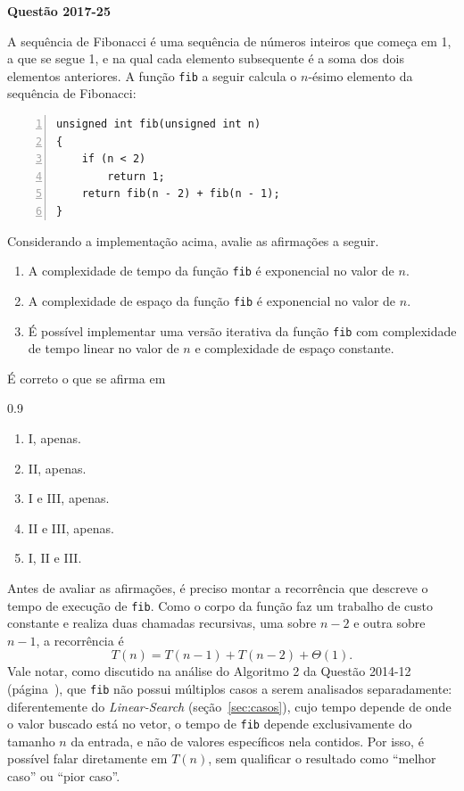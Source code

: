 \documentclass[12pt,a4paper]{article}
\newenvironment{question}[1]{%
    \pdfbookmark[3]{Questão #1}{q:#1}
    \label{q:#1}
    \bigskip\par\noindent
    \textbf{Questão #1} \dotfill
    \medskip\par\nopagebreak\noindent
    \ignorespaces
}{%
    \noindent\dotfill\medskip
}
\begin{document}
\begin{question}{2017-25}
A sequência de Fibonacci é uma sequência de números inteiros que começa em 1, a que se segue 1,
e na qual cada elemento subsequente é a soma dos dois elementos anteriores.
A função \texttt{fib} a seguir calcula o $n$-ésimo elemento da sequência de Fibonacci:

\medskip\noindent\begin{minipage}{\linewidth}
\begin{Verbatim}[numbers=left]
unsigned int fib(unsigned int n)
{
    if (n < 2)
        return 1;
    return fib(n - 2) + fib(n - 1);
}
\end{Verbatim}
\medskip
\end{minipage}

\noindent
Considerando a implementação acima, avalie as afirmações a seguir.

\begin{enumerate}[label=\Roman*.]
    \item A complexidade de tempo da função \texttt{fib} é exponencial no valor de $n$.
    \item A complexidade de espaço da função \texttt{fib} é exponencial no valor de $n$.
    \item É possível implementar uma versão iterativa da função \texttt{fib} com complexidade de tempo linear
    no valor de $n$ e complexidade de espaço constante.
\end{enumerate}

\noindent
É correto o que se afirma em

\begin{spacing}{0.9}
\begin{small}
\begin{enumerate}[label=\Alph*)]
    \item I, apenas.
    \item II, apenas.
    \item I e III, apenas.
    \item II e III, apenas.
    \item I, II e III.
\end{enumerate}
\end{small}
\end{spacing}
\end{question}

Antes de avaliar as afirmações, é preciso montar a recorrência que descreve o tempo de execução de \texttt{fib}.
Como o corpo da função faz um trabalho de custo constante e realiza duas chamadas recursivas,
uma sobre $n-2$ e outra sobre $n-1$, a recorrência é
\[
    T(n) = T(n-1) + T(n-2) + \Theta(1).
\]
Vale notar, como discutido na análise do Algoritmo 2 da Questão 2014-12 (página~\pageref{q:2014-12}),
que \texttt{fib} não possui múltiplos casos a serem analisados separadamente:
diferentemente do \textit{Linear-Search} (seção~\ref{sec:casos}), cujo tempo depende de onde o valor buscado
está no vetor, o tempo de \texttt{fib} depende exclusivamente do tamanho $n$ da entrada,
e não de valores específicos nela contidos. Por isso, é possível falar diretamente em $T(n)$,
sem qualificar o resultado como ``melhor caso'' ou ``pior caso''.
\end{document}
